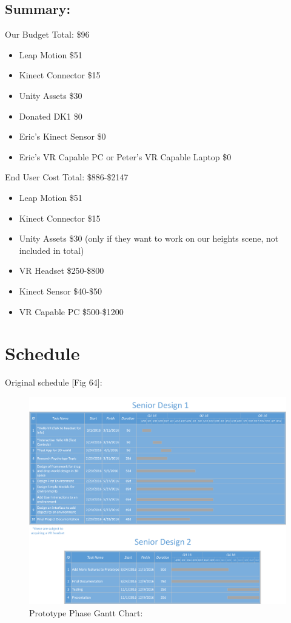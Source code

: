 \documentclass[a4paper,10pt]{article}
\begin{document}
\subsection{Summary:}
Our Budget Total: \$96
\begin{itemize}
	\item Leap Motion \$51
	\item Kinect Connector \$15
	\item Unity Assets \$30
	\item Donated DK1 \$0
	\item Eric's Kinect Sensor \$0
	\item Eric's VR Capable PC or Peter's VR Capable Laptop \$0
\end{itemize}
End User Cost Total: \$886-\$2147
\begin{itemize}
	\item Leap Motion \$51
	\item Kinect Connector \$15
	\item Unity Assets \$30 (only if they want to work on our heights scene, not included in total)
	\item VR Headset \$250-\$800
	\item Kinect Sensor \$40-\$50
	\item VR Capable PC \$500-\$1200
\end{itemize}
			    
	\pagebreak    
	\section{Schedule}
	Original schedule [Fig 64]:
	\begin{figure}[H]
		\includegraphics[width=\linewidth]{scheduleSR.png}
		\caption{Prototype Phase Gantt Chart:}
		\label{fig:pchart}
	\end{figure}
	
\end{document}
